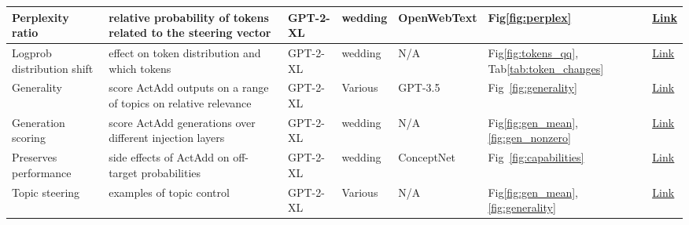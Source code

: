 \begin{table}[h!t]
\begin{tabular}{p{1.9cm}|p{2.5cm}lllll}
Perplexity \!ratio & \small relative probability of tokens related to the steering vector & \small GPT-2-XL & \small wedding & \small OpenWebText & \small Fig\ref{fig:perplex} & \underline{\href{
https://zenodo.org/records/13879423
}{Link}}\\\hline
Logprob \!distribution \!shift & \small effect on token distribution and which tokens & \small GPT-2-XL & \small wedding & N/A & \small Fig\ref{fig:tokens_qq}, Tab\ref{tab:token_changes} & \underline{\href{
https://zenodo.org/records/13879423
}{Link}}
\\\hline
Generality & \small score ActAdd outputs on a range of topics on relative relevance & \small GPT-2-XL & \small Various & GPT-3.5 & \small Fig~\ref{fig:generality} & \underline{\href{
https://zenodo.org/records/13879423
}{Link}}  \\ \hline
Generation scoring & \small score ActAdd generations over different injection layers &  \small GPT-2-XL & \small wedding & \small N/A & \small Fig\ref{fig:gen_mean},\ref{fig:gen_nonzero} & \underline{\href{
https://zenodo.org/records/13879423
}{Link}}  \\\hline
Preserves performance& \small side effects of ActAdd on off-target probabilities 
& \small GPT-2-XL & \small wedding & \small ConceptNet & \small Fig~\ref{fig:capabilities} &  \underline{\href{
https://zenodo.org/records/13879423
}{Link}} \\\hline
Topic \!steering & \small examples of topic control & \small GPT-2-XL & \small Various & \small N/A & \small Fig\ref{fig:gen_mean},\ref{fig:generality} & \underline{\href{
https://tinyurl.com/actadd3
}{Link}}  \\\hline

\end{tabular}
\end{table}
